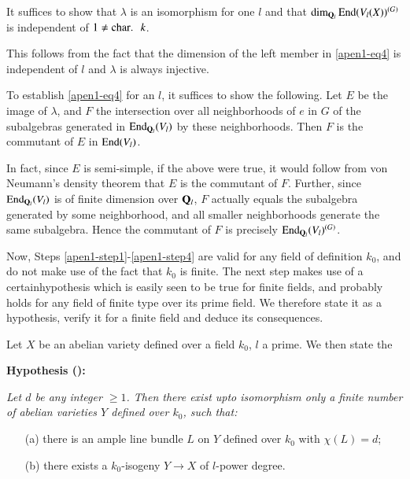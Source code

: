 \begin{romanstep}\label{apen1-step3}
It suffices to show that $\lambda$ is an isomorphism for one $l$ and that $\dim_{\mathbf{Q}_l} \operatorname{End} (V_l (X))^{(G)}$ is independent of $1 \neq \operatorname{char} \ldotp ~~k$.
\end{romanstep}

This follows from the fact that the dimension of the left member in \eqref{apen1-eq4} is independent of $l$ and $\lambda$ is always injective.

\begin{romanstep}\label{apen1-step4}
To establish \eqref{apen1-eq4} for an $l$, it suffices to show the following. Let $E$ be the image of $\lambda$, and $F$ the intersection over all neighborhoods of $e$ in $G$ of the subalgebras generated in $\operatorname{End}_{\mathbf{Q}_l} (V_l)$ by these neighborhoods. Then $F$ is the commutant of $E$ in $\operatorname{End} (V_l)$.
\end{romanstep}

In fact, since $E$ is semi-simple, if the above were true, it would follow from von Neumann's density theorem that $E$ is the commutant of $F$. Further, since $\operatorname{End}_{\mathbf{Q}_l} (V_l)$ is of finite dimension over $\mathbf{Q}_l$, $F$ actually equals the subalgebra generated by some neighborhood, and all smaller neighborhoods generate the same subalgebra. Hence the commutant of $F$ is precisely $\operatorname{End}_{\mathbf{Q}_l} (V_l)^{(G)}$.

Now, Steps \ref{apen1-step1}-\ref{apen1-step4} are valid for any field of definition $k_0$, and do not make use of the fact that $k_0$ is finite. The next step makes use of a certain\pageoriginale hypothesis which is easily seen to be true for finite fields, and probably holds for any field of finite type over its prime field. We therefore state it as a hypothesis, verify it for a finite field and deduce its consequences.

Let $X$ be an abelian variety defined over a field $k_0$, $l$ a prime. We then state the 

{\bf Hypothesis ():} {\em Let $d$ be any integer $\geqslant 1$. Then there exist upto isomorphism only a finite number of abelian varieties $Y$ defined over $k_0$, such that:
\begin{itemize}
\item[(a)] there is an ample line bundle $L$ on $Y$ defined over $k_0$ with $\chi(L) =d$;

\item[(b)] there exists a $k_0$-isogeny $Y \to X$ of $l$-power degree.
\end{itemize}}

